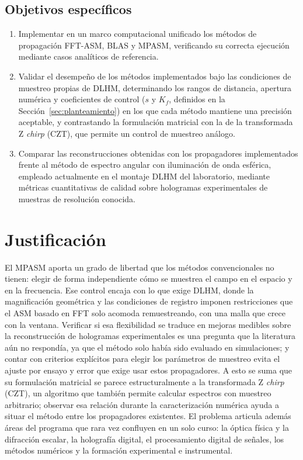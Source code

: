 \subsection*{Objetivos específicos}

\begin{enumerate}[label=\arabic*.]
  \item Implementar en un marco computacional unificado los métodos de
  propagación FFT-ASM, BLAS y MPASM, verificando su correcta ejecución mediante
  casos analíticos de referencia.

  \item Validar el desempeño de los métodos implementados bajo las condiciones
  de muestreo propias de DLHM, determinando los rangos de distancia, apertura
  numérica y coeficientes de control ($s$ y $K_f$, definidos en la
  Sección~\ref{sec:planteamiento}) en los que cada método mantiene una
  precisión aceptable, y contrastando la formulación matricial con la de la
  transformada Z \emph{chirp} (CZT), que permite un control de muestreo
  análogo.

  \item Comparar las reconstrucciones obtenidas con los propagadores
  implementados frente al método de espectro angular con iluminación de onda
  esférica, empleado actualmente en el montaje DLHM del laboratorio, mediante
  métricas cuantitativas de calidad sobre hologramas experimentales de muestras
  de resolución conocida.
\end{enumerate}

\section{Justificación}

El MPASM aporta un grado de libertad que los métodos convencionales no tienen:
elegir de forma independiente cómo se muestrea el campo en el espacio y en la
frecuencia. Ese control encaja con lo que exige DLHM, donde la magnificación
geométrica y las condiciones de registro imponen restricciones que el ASM
basado en FFT solo acomoda remuestreando, con una malla que crece con la
ventana. Verificar si esa flexibilidad se traduce en
mejoras medibles sobre la reconstrucción de hologramas experimentales es una
pregunta que la literatura aún no respondía, ya que el método solo había sido
evaluado en simulaciones; y contar con criterios explícitos para elegir los
parámetros de muestreo evita el ajuste por ensayo y error que exige usar estos
propagadores. A esto se suma que su formulación matricial se parece
estructuralmente a la transformada Z \emph{chirp} (CZT), un algoritmo que
también permite calcular espectros con muestreo arbitrario; observar esa
relación durante la caracterización numérica ayuda a situar el método entre los
propagadores existentes. El problema articula además áreas del programa que
rara vez confluyen en un solo curso: la óptica física y la difracción escalar,
la holografía digital, el procesamiento digital de señales, los métodos
numéricos y la formación experimental e instrumental.

